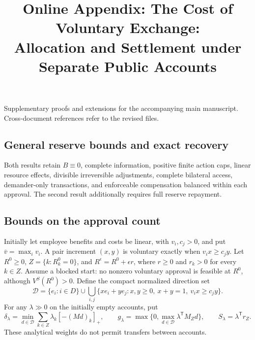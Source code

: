 \documentclass[ecta,draft,supplement]{econsocart}
\theoremstyle{definition}
\theoremstyle{definition}
\begin{document}
\begin{frontmatter}
\title{Online Appendix: The Cost of Voluntary Exchange:\\
Allocation and Settlement under Separate Public Accounts}
\end{frontmatter}
\noindent Supplementary proofs and extensions for the accompanying main manuscript. Cross-document references refer to the revised files.
\begin{appendix}
\section{General reserve bounds and exact recovery}
\label{app:designproofs}

Both results retain $B\equiv0$, complete information, positive finite
action caps, linear resource effects, divisible irreversible adjustments,
complete bilateral access, demander-only transactions, and enforceable
compensation balanced within each approval. The second result additionally
requires full reserve repayment.

\subsection{Bounds on the approval count}

Initially let employee benefits and costs be linear, with $v_i,c_j>0$,
and put $\bar v=\max_i v_i$. A pair increment $(x,y)$ is voluntary
exactly when $v_ix\geq c_jy$. Let $R^0\geq0$,
$Z=\{k:R_k^0=0\}$, and $R^\epsilon=R^0+\epsilon r$, where
$r\geq0$ and $r_k>0$ for every $k\in Z$. Assume a blocked start:
no nonzero voluntary approval is feasible at $R^0$, although
$V^S(R^0)>0$. Define the compact normalized direction set
\[
 \mathcal D=\{e_i:i\in D\}\cup
 \bigcup_{i,j}\{xe_i+ye_j:x,y\geq0,\ x+y=1,\ v_ix\geq c_jy\}.
\]
For any $\lambda\gg0$ on the initially empty accounts, put
\begin{equation}
 \delta_\lambda=\min_{d\in\mathcal D}
       \sum_{k\in Z}\lambda_k[-(Md)_k]_+,\qquad
 g_\lambda=\max\{0,\max_{d\in\mathcal D}\lambda^{\mathsf T}M_Zd\},
 \qquad S_\lambda=\lambda^{\mathsf T}r_Z.
 \label{eq:generalseedconstants}
\end{equation}
These analytical weights do not permit transfers between accounts.


\end{appendix}
\end{document}
